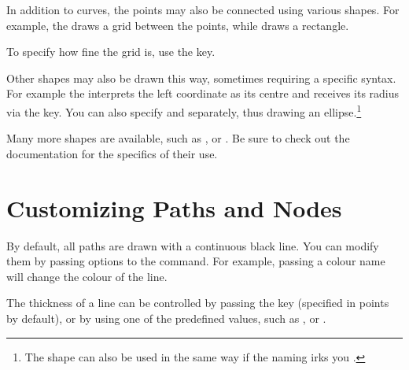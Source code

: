 In addition to curves, the points may also be connected using various shapes.
For example, the  draws a grid between the points, while
 draws a rectangle.
\begin{example}[vertical_mode, examplewidth=0.8\linewidth]
\end{example}
To specify how fine the grid is, use the  key.
\begin{example}[vertical_mode, examplewidth=0.8\linewidth]
\end{example}

Other shapes may also be drawn this way, sometimes requiring a specific syntax.
For example the  interprets the left coordinate as its centre and
receives its radius via the  key. You can also specify  and  separately, thus drawing an ellipse.\footnote{The
   shape can also be used in the same way if the naming irks you
  \smiley.}
\begin{example}[vertical_mode, examplewidth=0.9\linewidth]
\end{example}
Many more shapes are available, such as ,  or .
Be sure to check out the documentation for the specifics of their use.

\section{Customizing Paths and Nodes}

By default, all paths are drawn with a continuous black line. You can modify
them by passing options to the  command. For example, passing
a colour name will change the colour of the line.
\begin{example}
\end{example}

The thickness of a line can be controlled by passing the  key
(specified in points by default), or by using one of the predefined values, such
as ,  or .
\begin{example}
\end{example}

